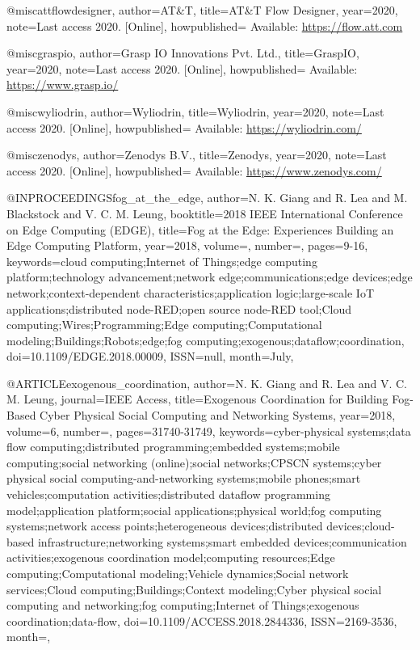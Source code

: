 @misc{attflowdesigner,
    author={AT\&T},
    title={{AT\&T Flow Designer}},
    year={2020},
    note={Last access 2020. [Online]},
    howpublished= {Available: \url{https://flow.att.com}}
}

@misc{graspio,
    author={Grasp IO Innovations Pvt. Ltd.},
    title={{GraspIO}},
    year={2020},
    note={Last access 2020. [Online]},
    howpublished= {Available: \url{https://www.grasp.io/}}
}

@misc{wyliodrin,
    author={Wyliodrin},
    title={{Wyliodrin}},
    year={2020},
    note={Last access 2020. [Online]},
    howpublished= {Available: \url{https://wyliodrin.com/}}
}

@misc{zenodys,
    author={Zenodys B.V.},
    title={{Zenodys}},
    year={2020},
    note={Last access 2020. [Online]},
    howpublished= {Available: \url{https://www.zenodys.com/}}
}


@INPROCEEDINGS{fog_at_the_edge,
    author={N. K. {Giang} and R. {Lea} and M. {Blackstock} and V. C. M. {Leung}},
    booktitle={2018 IEEE International Conference on Edge Computing (EDGE)},
    title={Fog at the Edge: Experiences Building an Edge Computing Platform},
    year={2018},
    volume={},
    number={},
    pages={9-16},
    keywords={cloud computing;Internet of Things;edge computing platform;technology advancement;network edge;communications;edge devices;edge network;context-dependent characteristics;application logic;large-scale IoT applications;distributed node-RED;open source node-RED tool;Cloud computing;Wires;Programming;Edge computing;Computational modeling;Buildings;Robots;edge;fog computing;exogenous;dataflow;coordination},
    doi={10.1109/EDGE.2018.00009},
    ISSN={null},
    month={July},
}

@ARTICLE{exogenous_coordination,
    author={N. K. {Giang} and R. {Lea} and V. C. M. {Leung}},
    journal={IEEE Access},
    title={Exogenous Coordination for Building Fog-Based Cyber Physical Social Computing and Networking Systems},
    year={2018},
    volume={6},
    number={},
    pages={31740-31749},
    keywords={cyber-physical systems;data flow computing;distributed programming;embedded systems;mobile computing;social networking (online);social networks;CPSCN systems;cyber physical social computing-and-networking systems;mobile phones;smart vehicles;computation activities;distributed dataflow programming model;application platform;social applications;physical world;fog computing systems;network access points;heterogeneous devices;distributed devices;cloud-based infrastructure;networking systems;smart embedded devices;communication activities;exogenous coordination model;computing resources;Edge computing;Computational modeling;Vehicle dynamics;Social network services;Cloud computing;Buildings;Context modeling;Cyber physical social computing and networking;fog computing;Internet of Things;exogenous coordination;data-flow},
    doi={10.1109/ACCESS.2018.2844336},
    ISSN={2169-3536},
    month={},
}

